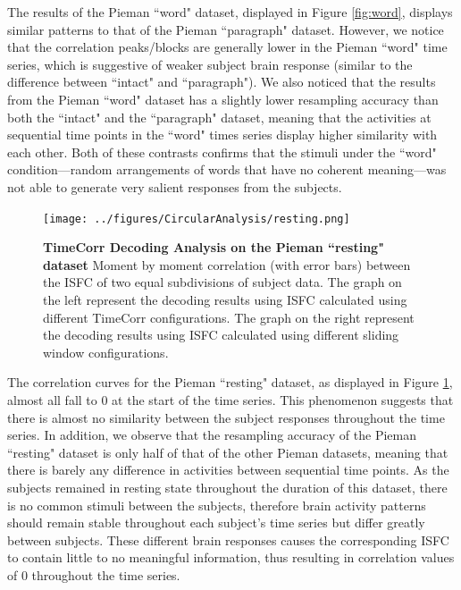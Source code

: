\documentclass[11pt]{article}
\begin{document}
The results of the Pieman ``word" dataset, displayed in Figure \ref{fig:word}, displays similar patterns to that of the Pieman ``paragraph" dataset. However, we notice that the correlation peaks/blocks are generally lower in the Pieman ``word" time series, which is suggestive of weaker subject brain response (similar to the difference between ``intact" and ``paragraph"). We also noticed that the results from the Pieman ``word" dataset has a slightly lower resampling accuracy than both the ``intact" and the ``paragraph" dataset, meaning that the activities at sequential time points in the ``word" times series display higher similarity with each other. Both of these contrasts confirms that the stimuli under the ``word" condition---random arrangements of words that have no coherent meaning---was not able to generate very salient responses from the subjects.

\begin{figure}[!htb]
\texttt{[image: ../figures/CircularAnalysis/resting.png]}
\caption{\textbf{TimeCorr Decoding Analysis on the Pieman ``resting" dataset} Moment by moment correlation (with error bars) between the ISFC of two equal subdivisions of subject data. The graph on the left represent the decoding results using ISFC calculated using different TimeCorr configurations. The graph on the right represent the decoding results using ISFC calculated using different sliding window configurations.}
\label{fig:resting}
\end{figure}

The correlation curves for the Pieman ``resting" dataset, as displayed in Figure \ref{fig:resting}, almost all fall to 0 at the start of the time series. This phenomenon suggests that there is almost no similarity between the subject responses throughout the time series. In addition, we observe that the resampling accuracy of the Pieman ``resting" dataset is only half of that of the other Pieman datasets, meaning that there is barely any difference in activities between sequential time points. As the subjects remained in resting state throughout the duration of this dataset, there is no common stimuli between the subjects, therefore brain activity patterns should remain stable throughout each subject's time series but differ greatly between subjects. These different brain responses causes the corresponding ISFC to contain little to no meaningful information, thus resulting in correlation values of 0 throughout the time series.
\end{document}
